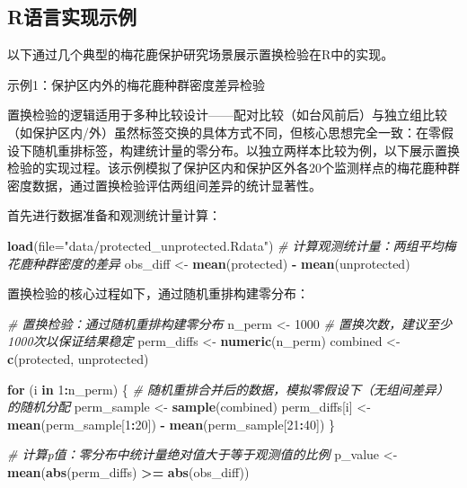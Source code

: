 \documentclass[
  twoside,12pt,fontset=none]{ctexbook}
\newenvironment{Shaded}{\begin{snugshade}}{\end{snugshade}}
\newcommand{\AttributeTok}[1]{\textcolor[rgb]{0.13,0.29,0.53}{#1}}
\newcommand{\CommentTok}[1]{\textcolor[rgb]{0.56,0.35,0.01}{\textit{#1}}}
\newcommand{\ControlFlowTok}[1]{\textcolor[rgb]{0.13,0.29,0.53}{\textbf{#1}}}
\newcommand{\DecValTok}[1]{\textcolor[rgb]{0.00,0.00,0.81}{#1}}
\newcommand{\FunctionTok}[1]{\textcolor[rgb]{0.13,0.29,0.53}{\textbf{#1}}}
\newcommand{\NormalTok}[1]{#1}
\newcommand{\OtherTok}[1]{\textcolor[rgb]{0.56,0.35,0.01}{#1}}
\newcommand{\SpecialCharTok}[1]{\textcolor[rgb]{0.81,0.36,0.00}{\textbf{#1}}}
\newcommand{\StringTok}[1]{\textcolor[rgb]{0.31,0.60,0.02}{#1}}
\begin{document}
\hypertarget{rux8bedux8a00ux5b9eux73b0ux793aux4f8b}{%
\subsection{R语言实现示例}\label{rux8bedux8a00ux5b9eux73b0ux793aux4f8b}}

以下通过几个典型的梅花鹿保护研究场景展示置换检验在R中的实现。

示例1：保护区内外的梅花鹿种群密度差异检验

置换检验的逻辑适用于多种比较设计------配对比较（如台风前后）与独立组比较（如保护区内/外）虽然标签交换的具体方式不同，但核心思想完全一致：在零假设下随机重排标签，构建统计量的零分布。以独立两样本比较为例，以下展示置换检验的实现过程。该示例模拟了保护区内和保护区外各20个监测样点的梅花鹿种群密度数据，通过置换检验评估两组间差异的统计显著性。

首先进行数据准备和观测统计量计算：

\begin{Shaded}
\begin{Highlighting}[]
\FunctionTok{load}\NormalTok{(}\AttributeTok{file=}\StringTok{"data/protected\_unprotected.Rdata"}\NormalTok{)}
\CommentTok{\# 计算观测统计量：两组平均梅花鹿种群密度的差异}
\NormalTok{obs\_diff }\OtherTok{\textless{}{-}} \FunctionTok{mean}\NormalTok{(protected) }\SpecialCharTok{{-}} \FunctionTok{mean}\NormalTok{(unprotected)}
\end{Highlighting}
\end{Shaded}

置换检验的核心过程如下，通过随机重排构建零分布：

\begin{Shaded}
\begin{Highlighting}[]
\CommentTok{\# 置换检验：通过随机重排构建零分布}
\NormalTok{n\_perm }\OtherTok{\textless{}{-}} \DecValTok{1000}  \CommentTok{\# 置换次数，建议至少1000次以保证结果稳定}
\NormalTok{perm\_diffs }\OtherTok{\textless{}{-}} \FunctionTok{numeric}\NormalTok{(n\_perm)}
\NormalTok{combined }\OtherTok{\textless{}{-}} \FunctionTok{c}\NormalTok{(protected, unprotected)}

\ControlFlowTok{for}\NormalTok{ (i }\ControlFlowTok{in} \DecValTok{1}\SpecialCharTok{:}\NormalTok{n\_perm) \{}
  \CommentTok{\# 随机重排合并后的数据，模拟零假设下（无组间差异）的随机分配}
\NormalTok{  perm\_sample }\OtherTok{\textless{}{-}} \FunctionTok{sample}\NormalTok{(combined)}
\NormalTok{  perm\_diffs[i] }\OtherTok{\textless{}{-}} \FunctionTok{mean}\NormalTok{(perm\_sample[}\DecValTok{1}\SpecialCharTok{:}\DecValTok{20}\NormalTok{]) }\SpecialCharTok{{-}} \FunctionTok{mean}\NormalTok{(perm\_sample[}\DecValTok{21}\SpecialCharTok{:}\DecValTok{40}\NormalTok{])}
\NormalTok{\}}

\CommentTok{\# 计算p值：零分布中统计量绝对值大于等于观测值的比例}
\NormalTok{p\_value }\OtherTok{\textless{}{-}} \FunctionTok{mean}\NormalTok{(}\FunctionTok{abs}\NormalTok{(perm\_diffs) }\SpecialCharTok{\textgreater{}=} \FunctionTok{abs}\NormalTok{(obs\_diff))}
\end{Highlighting}
\end{Shaded}
\end{document}

